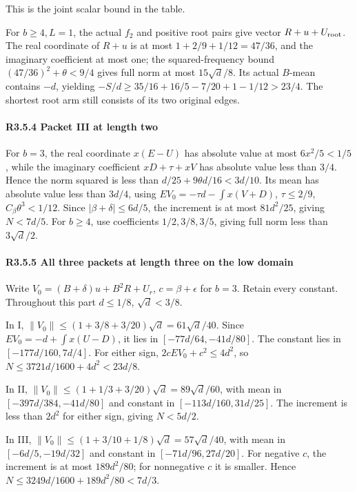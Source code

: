 This is the joint scalar bound in the table.

For \(b\ge4,\allowbreak \allowbreak  L=1\), the actual \(f_2\) and positive root pairs give vector \(R+u+U_{\rm root}\). The real coordinate of \(R+u\) is at most \(1+2/9+1/12=47/36\), and the imaginary coefficient at most one; the squared-frequency bound \((47/36)^2+\theta<9/4\) gives full norm at most \(15\sqrt d/8\). Its actual \(B\)-mean contains \(-d\), yielding \(-S/d\ge35/16+16/5-7/20+1-1/12>23/4\). The shortest root arm still consists of its two original edges.

\paragraph{R3.5.4 Packet III at length two}

For \(b=3\), the real coordinate \(x(E-U)\) has absolute value at most \(6x^2/5<1/5\), while the imaginary coefficient \(xD+\tau+xV\) has absolute value less than \(3/4\). Hence the norm squared is less than \(d/25+9\theta d/16<3d/10\). Its mean has absolute value less than \(3d/4\), using \(EV_0=-\tau d-\int x(V+D)\), \(\tau\le2/9\), \(C_\beta\theta^3<1/12\). Since \(|\beta+\delta|\le6d/5\), the increment is at most \(81d^2/25\), giving \(N<7d/5\). For \(b\ge4\), use coefficients \(1/2,\allowbreak \allowbreak  3/8,\allowbreak \allowbreak  3/5\), giving full norm less than \(3\sqrt d/2\).

\paragraph{R3.5.5 All three packets at length three on the low domain}

Write \(V_0=(B+\delta)u+B^2R+U_r\), \(c=\beta+\epsilon\) for \(b=3\). Retain every constant. Throughout this part \(d\le1/8\), \(\sqrt d<3/8\).

In I, \(\|V_0\|\le(1+3/8+3/20)\sqrt d=61\sqrt d/40\). Since \(EV_0=-d+\int x(U-D)\), it lies in \([-77d/64,\allowbreak \allowbreak -41d/80]\). The constant lies in \([-177d/160,\allowbreak \allowbreak  7d/4]\). For either sign, \(2cEV_0+c^2\le4d^2\), so \(N\le3721d/1600+4d^2<23d/8\).

In II, \(\|V_0\|\le(1+1/3+3/20)\sqrt d=89\sqrt d/60\), with mean in \([-397d/384,\allowbreak \allowbreak -41d/80]\) and constant in \([-113d/160,\allowbreak \allowbreak  31d/25]\). The increment is less than \(2d^2\) for either sign, giving \(N<5d/2\).

In III, \(\|V_0\|\le(1+3/10+1/8)\sqrt d=57\sqrt d/40\), with mean in \([-6d/5,\allowbreak \allowbreak -19d/32]\) and constant in \([-71d/96,\allowbreak \allowbreak  27d/20]\). For negative \(c\), the increment is at most \(189d^2/80\); for nonnegative \(c\) it is smaller. Hence \(N\le3249d/1600+189d^2/80<7d/3\).

